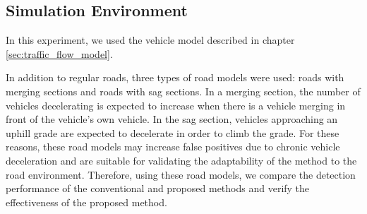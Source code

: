 \documentclass[paper]{ieice}
\begin{document}
\subsection{Simulation Environment}
\label{sec:simulation_environment}
%
In this experiment, we used the vehicle model described in chapter \ref{sec:traffic_flow_model}.
%
\par
%
In addition to regular roads, three types of road models were used: roads with merging sections and roads with sag sections.
%
In a merging section, the number of vehicles decelerating is expected to increase when there is a vehicle merging in front of the vehicle's own vehicle.
%
In the sag section, vehicles approaching an uphill grade are expected to decelerate in order to climb the grade.
%
For these reasons, these road models may increase false positives due to chronic vehicle deceleration and are suitable for validating the adaptability of the method to the road environment.
%
Therefore, using these road models, we compare the detection performance of the conventional and proposed methods and verify the effectiveness of the proposed method.
%
\par
%
\end{document}
